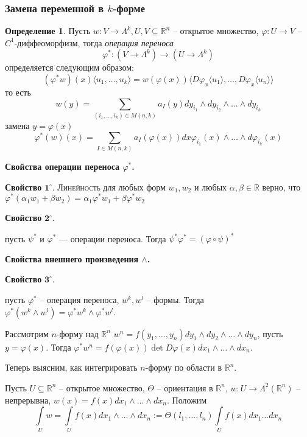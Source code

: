 \documentclass[a5paper]{article}
\newcounter{through}
\theoremstyle{plain}
\theoremstyle{definition}
\newtheorem{definition}[through]{Определение}
\numberwithin{through}{section}
\numberwithin{equation}{section}
\begin{document}
\subsubsection{Замена переменной в $k$-форме}
\begin{definition}
	Пусть $w: V \to \Lambda^k, U, V \subseteq \mathbb{R}^n$ -- открытое множество, 
	$\varphi: U \to V$ -- $C^1$-диффеоморфизм, тогда \textit{операция переноса} 
	\[ \varphi^*: (V \to \Lambda^k) \to (U \to \Lambda^k) \]
	определяется следующим образом:
	\[ (\varphi^*w)(x)\langle u_1,\ldots,u_k\rangle = w(\varphi(x))\langle D\varphi_x \langle u_1 \rangle,
	\ldots, D\varphi_x\langle u_n \rangle \rangle  \]
	то есть 
	\[ w(y) = \sum\limits_{ (i_1,\ldots,i_k) \in M(n,k) } a_I(y) dy_{i_1}\wedge dy_{i_2} \wedge \ldots \wedge dy_{i_k} \]
	замена $y = \varphi(x)$
	\[ \varphi^*(w)(x) = \sum\limits_{I \in M(n,k)} a_I(\varphi(x)) dx\varphi_{i_1}(x) \wedge\ldots\wedge d\varphi_{i_k}(x) \]
\end{definition}

{\bf Свойства операции переноса $\varphi^*$.}

\medskip
{\bf Свойство} $\mathbf{1^\circ.}$
{\textsc{Линейность}}
для любых форм $w_1, w_2$ и любых $\alpha, \beta \in \mathbb{R}$ верно, что
$\varphi^*(\alpha_1w_1 + \beta w_2) = \alpha_1\varphi^*w_1 + \beta \varphi^* w_2$

\medskip
{\bf Свойство} $\mathbf{2^\circ.}$

пусть $\psi^*$ и $\varphi^*$ --- операции переноса. Тогда
$\psi^*\varphi^* = (\varphi \circ \psi)^*$

{\bf Свойства внешнего произведения $\wedge$.}

\medskip
{\bf Свойство} $\mathbf{3^\circ.}$

пусть $\varphi^*$ -- операция переноса, $w^k, w^l$ -- формы. Тогда
$\varphi^* (w^k \wedge w^l) = \varphi^* w^k \wedge \varphi^* w^l$.

Рассмотрим $n$-форму над $\mathbb{R}^n$ $w^n = f(y_1,\ldots,y_n)dy_1 \wedge dy_2 \wedge\ldots \wedge dy_n$, пусть $y=\varphi(x)$.
Тогда $\varphi^*w^n = f(\varphi(x)) \det D\varphi(x) dx_1\wedge\ldots\wedge dx_n$.

\medskip
Теперь выясним, как интегрировать $n$-форму по области в $\mathbb{R}^n$.

Пусть $U \subseteq \mathbb{R}^n$ -- открытое множество, $\Theta$ -- ориентация в $\mathbb{R}^n$, $w : U \to \Lambda^2(\mathbb{R}^n)$ -- непрерывна, $w(x) = f(x) dx_1 \wedge\ldots\wedge dx_n$. Положим
\[ \int\limits_U w = \int\limits_U f(x)dx_1\wedge \ldots \wedge dx_n := 
\Theta(l_1,\ldots, l_n) \int\limits_U f(x)dx_1\ldots dx_n \]
\end{document}
